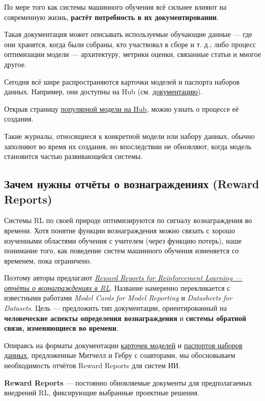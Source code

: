 \documentclass[11pt,a4paper]{article}
\begin{document}
По мере того как системы машинного обучения всё сильнее влияют на современную жизнь, \textbf{растёт потребность в их документировании}.

Такая документация может описывать используемые обучающие данные --- где они хранятся, когда были собраны, кто участвовал в сборе и т. д.; либо процесс оптимизации модели --- архитектуру, метрики оценки, связанные статьи и многое другое.

Сегодня всё шире распространяются карточки моделей и паспорта наборов данных. Например, они доступны на Hub (см. \href{https://huggingface.co/docs/hub/model-cards}{документацию}).

Открыв страницу \href{https://huggingface.co/models}{популярной модели на Hub}, можно узнать о процессе её создания.

Такие журналы, относящиеся к конкретной модели или набору данных, обычно заполняют во время их создания, но впоследствии не обновляют, когда модель становится частью развивающейся системы.

\subsection{Зачем нужны отчёты о вознаграждениях (Reward Reports)}\label{motivating-reward-reports}

Системы RL по своей природе оптимизируются по сигналу вознаграждения во времени. Хотя понятие функции вознаграждения можно связать с хорошо изученными областями обучения с учителем (через функцию потерь), наше понимание того, как поведение систем машинного обучения изменяется со временем, пока ограничено.

Поэтому авторы предлагают \href{https://www.notion.so/Brief-introduction-to-RL-documentation-b8cbda5a6f5242338e0756e6bef72af4}{\emph{Reward Reports for Reinforcement Learning --- отчёты о вознаграждениях в RL}}. Название намеренно перекликается с известными работами \emph{Model Cards for Model Reporting} и \emph{Datasheets for Datasets}. Цель --- предложить тип документации, ориентированный на \textbf{человеческие аспекты определения вознаграждения} и \textbf{системы обратной связи, изменяющиеся во времени}.

Опираясь на форматы документации \href{https://arxiv.org/abs/1810.03993}{карточек моделей} и \href{https://arxiv.org/abs/1803.09010}{паспортов наборов данных}, предложенные Митчелл и Гебру с соавторами, мы обосновываем необходимость отчётов Reward Reports для систем ИИ.

\textbf{Reward Reports} --- постоянно обновляемые документы для предполагаемых внедрений RL, фиксирующие выбранные проектные решения.
\end{document}
